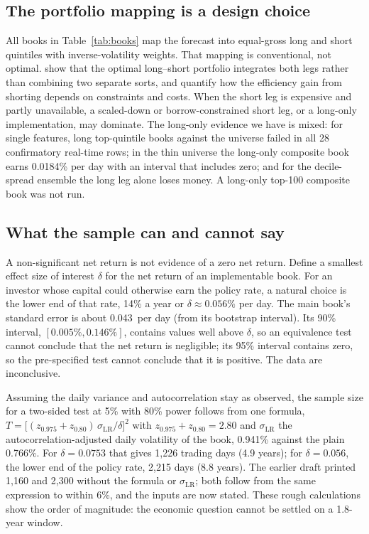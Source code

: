 \subsection{The portfolio mapping is a design choice}\label{sec:mapping}

All books in Table~\ref{tab:books} map the forecast into equal-gross long and short quintiles with inverse-volatility weights. That mapping is conventional, not optimal. \citet{jacobs1998} show that the optimal long--short portfolio integrates both legs rather than combining two separate sorts, and \citet{grinold2000b} quantify how the efficiency gain from shorting depends on constraints and costs. When the short leg is expensive and partly unavailable, a scaled-down or borrow-constrained short leg, or a long-only implementation, may dominate. The long-only evidence we have is mixed: for single features, long top-quintile books against the universe failed in all 28 confirmatory real-time rows; in the thin universe the long-only composite book earns 0.0184\% per day with an interval that includes zero; and for the decile-spread ensemble the long leg alone loses money. A long-only top-100 composite book was not run.

\subsection{What the sample can and cannot say}

A non-significant net return is not evidence of a zero net return. Define a smallest effect size of interest $\delta$ for the net return of an implementable book. For an investor whose capital could otherwise earn the policy rate, a natural choice is the lower end of that rate, 14\% a year or $\delta\approx0.056\%$ per day. The main book's standard error is about 0.043\pp\ per day (from its bootstrap interval). Its 90\% interval, $[0.005\%,0.146\%]$, contains values well above $\delta$, so an equivalence test \citep{lakens2017} cannot conclude that the net return is negligible; its 95\% interval contains zero, so the pre-specified test cannot conclude that it is positive. The data are inconclusive.

Assuming the daily variance and autocorrelation stay as observed, the sample size for a two-sided test at 5\% with 80\% power follows from one formula, $T=\big[(z_{0.975}+z_{0.80})\,\sigma_{\mathrm{LR}}/\delta\big]^2$ with $z_{0.975}+z_{0.80}=2.80$ and $\sigma_{\mathrm{LR}}$ the autocorrelation-adjusted daily volatility of the book, 0.941\% against the plain 0.766\%. For $\delta=0.0753$ that gives 1,226 trading days (4.9 years); for $\delta=0.056$, the lower end of the policy rate, 2,215 days (8.8 years). The earlier draft printed 1,160 and 2,300 without the formula or $\sigma_{\mathrm{LR}}$; both follow from the same expression to within 6\%, and the inputs are now stated. These rough calculations show the order of magnitude: the economic question cannot be settled on a 1.8-year window.

